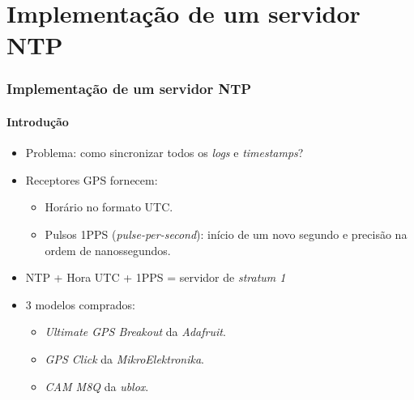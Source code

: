 \section {Implementação de um servidor NTP}


\begin{frame}
\frametitle{Implementação de um servidor NTP}
\framesubtitle{Introdução}

\begin{itemize}
  \item Problema: como sincronizar todos os \textit{logs} e
  \textit{timestamps}?
  \item Receptores GPS fornecem:
  \begin{itemize}
    \item Horário no formato UTC.
    \item Pulsos 1PPS (\textit{pulse-per-second}): início de um novo
    segundo e precisão na ordem de nanossegundos.
  \end{itemize}
  \item NTP + Hora UTC + 1PPS = servidor de \textit{stratum 1}
  \vspace{8pt}
  \item 3 modelos comprados:
  \begin{itemize}
    \item \textit{Ultimate GPS Breakout} da \textit{Adafruit}.
    \item \textit{GPS Click} da \textit{MikroElektronika}. 
    \item \textit{CAM M8Q} da \textit{ublox}.
  \end{itemize} 
\end{itemize}

\end{frame}

% 
% 
% 

